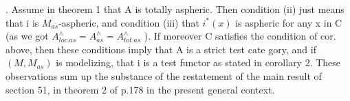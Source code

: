 
\hand{\uline{\textcolor{black}{Remark}}} . Assume  in theorem 1 that A is totally aspheric. Then
 condition (ii) just means that i is $M_{as}$-aspheric, and
condition (iii) that $i^{*}(x)$ is aspheric for any x in C (as  we got
$A^{\wedge}_{loc.as} = A^{\wedge}_{as} = A^{\wedge}_{tot.as}$ ). If moreover C satisfies the condition of
cor. above, then these conditions imply that  A is a strict test cate%
gory,  and if $(M,M_{as})$ is modelizing, that i is a test functor
as stated in corollary 2. These observations sum up the substance of
the restatement of the main result of section 51,  in theorem 2 of p.178\hand{,}
in the present general context.

